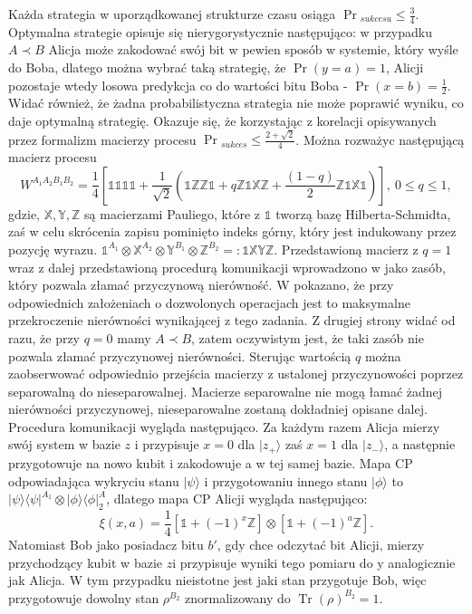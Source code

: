 \documentclass[10pt]{article} %
\DeclareMathOperator{\Trs}{Tr}
\newcommand{\Tr}[1]{\Trs(#1)}
\newcommand{\Ket}[1]{|#1\rangle}
\newcommand{\Bra}[1]{\langle#1|}
\newcommand{\WAll}{W^{A_1A_2B_1B_2}}
\newcommand{\X}{\mathbb{X}}
\newcommand{\Y}{\mathbb{Y}}
\newcommand{\Z}{\mathbb{Z}}
\newcommand{\I}{\mathbb{1}}
\begin{document}
Każda strategia w uporządkowanej strukturze czasu osiąga $\Pr{}_{sukcesu} \leq \frac{3}{4}$. Optymalna strategie opisuje się nierygorystycznie następująco: w przypadku $A \prec B$ Alicja może zakodować swój bit w pewien sposób w systemie, który wyśle do Boba, dlatego można wybrać taką strategię, że $\Pr(y=a) = 1$, Alicji pozostaje wtedy losowa predykcja co do wartości bitu Boba - $\Pr(x=b) = \frac{1}{2}$. Widać również, że żadna probabilistyczna strategia nie może poprawić wyniku, co daje optymalną strategię. Okazuje się, że korzystając z korelacji opisywanych przez formalizm macierzy procesu $\Pr{}_{sukces} \leq \frac{2+\sqrt{2}}{4}$.
Można rozważyc następującą macierz procesu
\begin{equation}
\WAll = \frac{1}{4}\left[
\I\I\I\I + \frac{1}{\sqrt{2}}(\I\Z\Z\I + q\Z\I\X\Z + \frac{(1-q)}{2}\Z\I\X\I)
\right],~ 0 \leq q \leq 1,
\end{equation}
gdzie, $\X, \Y, \Z$ są macierzami Pauliego, które z $\I$ tworzą bazę Hilberta-Schmidta, zaś w celu skrócenia zapisu pominięto indeks górny, który jest indukowany przez pozycję wyrazu. $\I^{A_1} \otimes \X^{A_2} \otimes \Y^{B_1} \otimes \Z^{B_2} =: \I\X\Y\Z$.
Przedstawioną macierz z $q=1$ wraz z dalej przedstawioną procedurą komunikacji wprowadzono w \cite{process_matrix} jako zasób, który pozwala złamać przyczynową nierówność. W \cite{max_violation} pokazano, że przy odpowiednich założeniach o dozwolonych operacjach jest to maksymalne przekroczenie nierówności
wynikającej z tego zadania. Z drugiej strony widać od razu, że przy $q=0$ mamy $A \prec B$, zatem oczywistym jest, że taki zasób nie pozwala złamać przyczynowej nierówności. Sterując wartością $q$ można zaobserwować odpowiednio przejścia macierzy z ustalonej przyczynowości poprzez separowalną do nieseparowalnej.
Macierze separowalne nie mogą łamać żadnej nierówności przyczynowej, nieseparowalne zostaną dokładniej opisane dalej. Procedura komunikacji wygląda następująco. 
Za każdym razem Alicja mierzy swój system w bazie $z$ i przypisuje $x = 0$ dla $\Ket{z_+}$ zaś $x=1$ dla $\Ket{z_-}$, a następnie przygotowuje na nowo kubit i zakodowuje a w tej samej bazie. Mapa CP odpowiadająca wykryciu stanu $\Ket{\psi}$ i przygotowaniu innego stanu $\Ket{\phi}$ to $\Ket{\psi}\Bra{\psi}^{A_1} \otimes
\Ket{\phi}\Bra{\phi}^A_2$, dlatego mapa CP Alicji wygląda następująco:
\begin{equation}
\xi(x, a) = \frac{1}{4}
\left[
\I + (-1)^x \Z
\right]
\otimes
\left[
\I  + (-1)^a \Z
\right	].
\end{equation}
Natomiast Bob jako posiadacz bitu $b'$, gdy chce odczytać bit Alicji, mierzy przychodzący kubit w bazie $z$i przypisuje wyniki tego pomiaru do y analogicznie jak Alicja. W tym przypadku nieistotne jest jaki stan przygotuje Bob, więc przygotowuje dowolny stan $\rho^{B_2}$ znormalizowany do $\Tr \rho^{B_2} = 1$.
\end{document}
